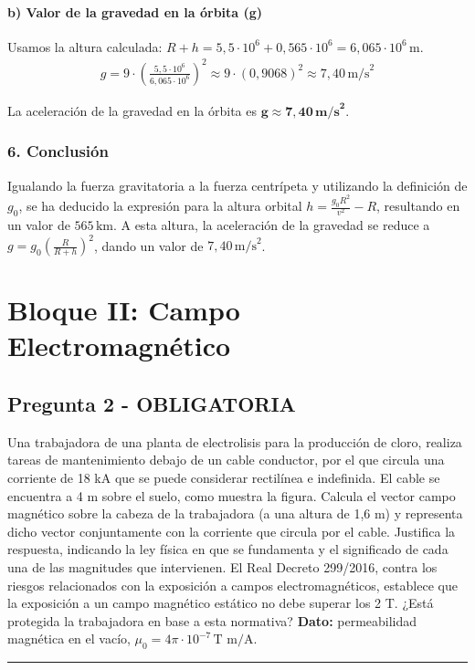 \paragraph*{b) Valor de la gravedad en la órbita (g)}
Usamos la altura calculada: $R+h = 5,5 \cdot 10^6 + 0,565 \cdot 10^6 = 6,065 \cdot 10^6 \, \text{m}$.
\begin{gather}
    g = 9 \cdot \left(\frac{5,5 \cdot 10^6}{6,065 \cdot 10^6}\right)^2 \approx 9 \cdot (0,9068)^2 \approx 7,40 \, \text{m/s}^2
\end{gather}
\begin{cajaresultado}
    La aceleración de la gravedad en la órbita es $\boldsymbol{g \approx 7,40 \, \textbf{m/s}^2}$.
\end{cajaresultado}

\subsubsection*{6. Conclusión}
\begin{cajaconclusion}
Igualando la fuerza gravitatoria a la fuerza centrípeta y utilizando la definición de $g_0$, se ha deducido la expresión para la altura orbital $h = \frac{g_0 R^2}{v^2} - R$, resultando en un valor de $565\,\text{km}$. A esta altura, la aceleración de la gravedad se reduce a $g = g_0 (\frac{R}{R+h})^2$, dando un valor de $7,40\,\text{m/s}^2$.
\end{cajaconclusion}
\newpage

\section{Bloque II: Campo Electromagnético}
\label{sec:em_2025_jun_ord}

\subsection{Pregunta 2 - OBLIGATORIA}
\label{subsec:2_2025_jun_ord}

\begin{cajaenunciado}
Una trabajadora de una planta de electrolisis para la producción de cloro, realiza tareas de mantenimiento debajo de un cable conductor, por el que circula una corriente de 18 kA que se puede considerar rectilínea e indefinida. El cable se encuentra a 4 m sobre el suelo, como muestra la figura. Calcula el vector campo magnético sobre la cabeza de la trabajadora (a una altura de 1,6 m) y representa dicho vector conjuntamente con la corriente que circula por el cable. Justifica la respuesta, indicando la ley física en que se fundamenta y el significado de cada una de las magnitudes que intervienen. El Real Decreto 299/2016, contra los riesgos relacionados con la exposición a campos electromagnéticos, establece que la exposición a un campo magnético estático no debe superar los 2 T. ¿Está protegida la trabajadora en base a esta normativa?
\textbf{Dato:} permeabilidad magnética en el vacío, $\mu_{0}=4\pi\cdot10^{-7}\,\text{T m/A}$.
\end{cajaenunciado}
\hrule

